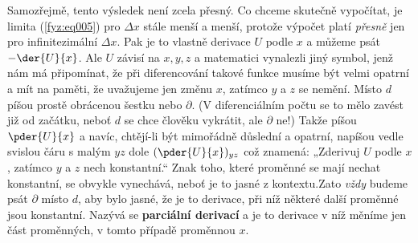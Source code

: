     Samozřejmě, tento výsledek není zcela přesný. Co chceme skutečně vypočítat, je limita 
    (\ref{fyz:eq005}) pro \(\Delta x\) stále menší a menší, protože výpočet platí \emph{přesně} 
    jen pro infinitezimální \(\Delta x\). Pak je to vlastně derivace \(U\) podle \(x\) a můžeme 
    psát \(-\der{U}{x}\). Ale \(U\) závisí na \(x, y, z\) a matematici vynalezli jiný symbol, jenž 
    nám má připomínat, že při diferencování takové funkce musíme být velmi opatrní a mít na paměti, 
    že uvažujeme jen změnu \(x\), zatímco \(y\) a \(z\) se nemění. Místo \(d\) píšou prostě 
    obrácenou šestku nebo \(\partial\). (V diferenciálním počtu se to mělo zavést již od začátku, 
    neboť \(d\) se chce člověku vykrátit, ale \(\partial\) ne!) Takže píšou \(\pder{U}{x}\) a 
    navíc, chtějí-li být mimořádně důslední a opatrní, napíšou vedle svislou čáru s malým \(yz\) 
    dole  \((\pder{U}{x})_{yz}\) což znamená: „Zderivuj \(U\) podle \(x\), zatímco \(y\) a \(z\) 
    nech konstantní.“ Znak toho, které proměnné se mají nechat konstantní, se obvykle vynechává, 
    neboť je to jasné z kontextu.Zato \emph{vždy} budeme psát \(\partial\) místo \(d\), aby bylo 
    jasné, že je to derivace, při níž některé další proměnné jsou konstantní. Nazývá se 
    \textbf{parciální derivací} a je to derivace v níž měníme jen část proměnných, v tomto případě 
    proměnnou \(x\).
    
